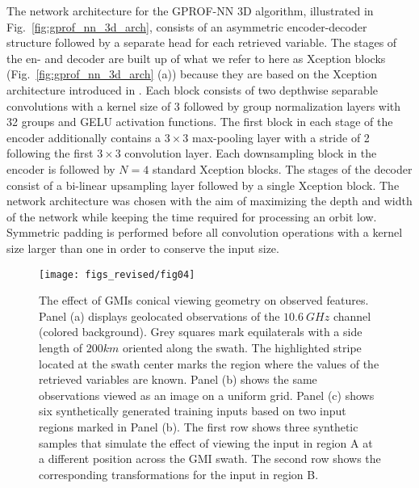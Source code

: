 \documentclass[journal abbreviation, manuscript]{copernicus}
\begin{document}
The network architecture for the GPROF-NN 3D algorithm, illustrated in
Fig.~\ref{fig:gprof_nn_3d_arch}, consists of an asymmetric encoder-decoder
structure followed by a separate head for each retrieved variable. The stages of
the en- and decoder are built up of what we refer to here as Xception blocks
(Fig.~\ref{fig:gprof_nn_3d_arch} (a)) because they are based on the Xception
architecture introduced in \citet{chollet17}. Each block consists of two
depthwise separable convolutions with a kernel size of 3 followed by group
normalization layers with 32 groups and GELU activation functions. The first
block in each stage of the encoder additionally contains a $3\times3$
max-pooling layer with a stride of 2 following the first $3\times3$ convolution
layer. Each downsampling block in the encoder is followed by $N = 4$ standard
Xception blocks. The stages of the decoder consist of a bi-linear upsampling
layer followed by a single Xception block. The network architecture was chosen
with the aim of maximizing the depth and width of the network while keeping the
time required for processing an orbit low. Symmetric padding is performed before
all convolution operations with a kernel size larger than one in order to
conserve the input size.


\begin{figure}[hbpt]
  \centering
    \texttt{[image: figs\_revised/fig04]}
    \caption{
      The effect of GMIs conical viewing geometry on observed features. Panel
      (a) displays geolocated observations of the $10.6\ \unit{GHz}$ channel
      (colored background). Grey squares mark equilaterals with a side length of
      $200\unit{km}$ oriented along the swath. The highlighted stripe located at
      the swath center marks the region where the values of the retrieved
      variables are known. Panel (b) shows the same observations viewed as an
      image on a uniform grid. Panel (c) shows six synthetically generated
      training inputs based on two input regions marked in Panel (b). The first
      row shows three synthetic samples that simulate the effect of viewing the
      input in region A at a different position across the GMI swath. The second
      row shows the corresponding transformations for the input in region B.
    }
  \label{fig:data_augmentation}
\end{figure}
\end{document}
